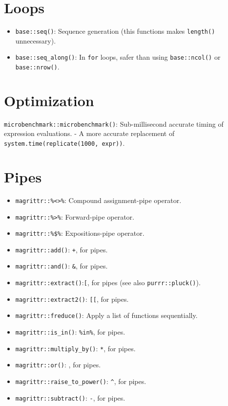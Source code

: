 \documentclass[
]{book}
\providecommand{\tightlist}{%
  \setlength{\itemsep}{0pt}\setlength{\parskip}{0pt}}
\begin{document}
\hypertarget{loops}{%
\section{Loops}\label{loops}}

\begin{itemize}
\tightlist
\item
  \texttt{base::seq()}: Sequence generation (this functions makes \texttt{length()} unnecessary).
\item
  \texttt{base::seq\_along()}: In \texttt{for} loops, safer than using \texttt{base::ncol()} or \texttt{base::nrow()}.
\end{itemize}

\hypertarget{optimization}{%
\section{Optimization}\label{optimization}}

\texttt{microbenchmark::microbenchmark()}: Sub-millisecond accurate timing of expression evaluations.
- A more accurate replacement of \texttt{system.time(replicate(1000,\ expr))}.

\hypertarget{pipes}{%
\section{Pipes}\label{pipes}}

\begin{itemize}
\tightlist
\item
  \texttt{magrittr::\%\textless{}\textgreater{}\%}: Compound assignment-pipe operator.
\item
  \texttt{magrittr::\%\textgreater{}\%}: Forward-pipe operator.
\item
  \texttt{magrittr::\%\$\%}: Expositions-pipe operator.
\item
  \texttt{magrittr::add()}: \texttt{+}, for pipes.
\item
  \texttt{magrittr::and()}: \texttt{\&}, for pipes.
\item
  \texttt{magrittr::extract()}:\texttt{{[}}, for pipes (see also \texttt{purrr::pluck()}).
\item
  \texttt{magrittr::extract2()}: \texttt{{[}{[}}, for pipes.
\item
  \texttt{magrittr::freduce()}: Apply a list of functions sequentially.
\item
  \texttt{magrittr::is\_in()}: \texttt{\%in\%}, for pipes.
\item
  \texttt{magrittr::multiply\_by()}: \texttt{*}, for pipes.
\item
  \texttt{magrittr::or()}: \texttt{\textbar{}}, for pipes.
\item
  \texttt{magrittr::raise\_to\_power()}: \texttt{\^{}}, for pipes.
\item
  \texttt{magrittr::subtract()}: \texttt{-}, for pipes.
\end{itemize}
\end{document}
